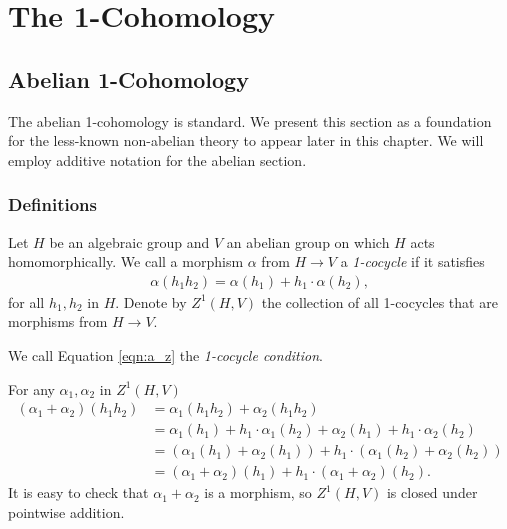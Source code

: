 
\chapter{The 1-Cohomology}
\label{Chapter3}

\section{Abelian 1-Cohomology}
The abelian 1-cohomology is standard. We present this section as a foundation for the less-known non-abelian theory to appear later in this chapter. We will employ additive notation for the abelian section.

\subsection{Definitions}
Let $H$ be an algebraic group and $V$ an abelian group on which $H$ acts homomorphically. We call a morphism $\alpha$ from $H\rightarrow V$ a  \emph{1-cocycle} if it satisfies
\begin{align}
  \alpha(h_1h_2) = \alpha(h_1) + h_1\cdot\alpha(h_2),
  \label{eqn:a_z}
\end{align}
for all $h_1, h_2$ in $H$. Denote by $Z^1\left( H, V \right)$ the collection of all 1-cocycles that are morphisms from $H\rightarrow V$.

We call Equation \ref{eqn:a_z} the \emph{1-cocycle condition}.

For any $\alpha_1, \alpha_2$ in $Z^1\left(H, V\right)$
\begin{align*}
	\left(\alpha_1 + \alpha_2\right)(h_1h_2) &=  \alpha_1(h_1h_2) +  \alpha_2(h_1h_2) \\
	&=  \alpha_1(h_1) + h_1\cdot\alpha_1(h_2) +  \alpha_2(h_1) + h_1\cdot\alpha_2(h_2)\\
	&=  \left( \alpha_1(h_1) + \alpha_2(h_1) \right) + h_1\cdot\left(\alpha_1(h_2) + \alpha_2(h_2)\right) \\
	&=  \left(\alpha_1+\alpha_2\right)(h_1) + h_1\cdot\left(\alpha_1 + \alpha_2\right)(h_2).
\end{align*}
It is easy to check that $\alpha_1 + \alpha_2$ is a morphism, so $Z^1(H, V)$ is closed under pointwise addition.

